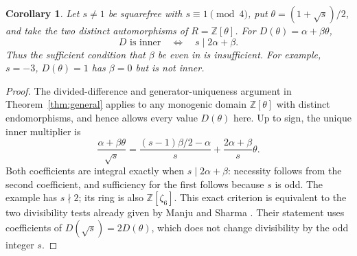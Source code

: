 \documentclass[11pt]{article}
\newtheorem{corollary}[theorem]{Corollary}
\newcommand{\ZZ}{\mathbb Z}
\begin{document}
\begin{corollary}\label{cor:quadratic}
Let $s\neq1$ be squarefree with $s\equiv1\pmod4$, put
$\theta=(1+\sqrt{s})/2$, and take the two distinct automorphisms of
$R=\ZZ[\theta]$. For $D(\theta)=\alpha+\beta\theta$,
\begin{equation}\label{eq:quadratic}
 D\text{ is inner}\quad\Longleftrightarrow\quad s\mid 2\alpha+\beta.
\end{equation}
Thus the sufficient condition that $\beta$ be even in
\cite[Theorem 4.2(ii), pp.~7--9]{C} is insufficient.
For example, $s=-3$, $D(\theta)=1$ has $\beta=0$ but is not inner.
\end{corollary}
\begin{proof}
The divided-difference and generator-uniqueness argument in
Theorem~\ref{thm:general} applies to any monogenic domain $\ZZ[\theta]$
with distinct endomorphisms, and hence allows every value $D(\theta)$
here. Up to sign, the unique inner multiplier is
\[
 \frac{\alpha+\beta\theta}{\sqrt{s}}
 =\frac{(s-1)\beta/2-\alpha}{s}
  +\frac{2\alpha+\beta}{s}\theta.
\]
Both coefficients are integral exactly when $s\mid2\alpha+\beta$:
necessity follows from the second coefficient, and sufficiency for the
first follows because $s$ is odd. The example has $s\nmid2$; its ring
is also $\ZZ[\zeta_6]$. This exact criterion is equivalent to the two
divisibility tests already given by Manju and Sharma
\cite[Theorem 3.5, p.~13; present in v1, p.~11]{MSrings}.
Their statement uses coefficients of $D(\sqrt{s})=2D(\theta)$, which
does not change divisibility by the odd integer $s$.
\end{proof}
\end{document}
